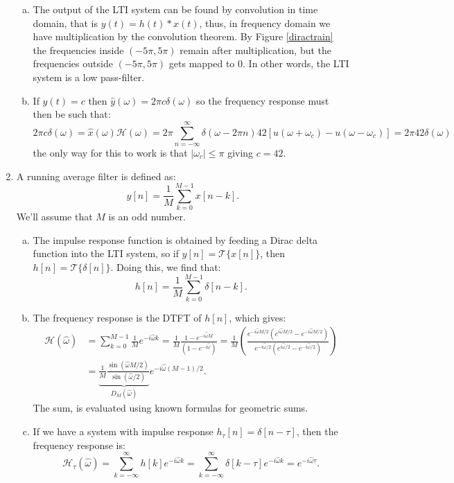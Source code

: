 \begin{enumerate}
\begin{enumerate}[a)]
\item The output of the LTI system can be found by convolution in time domain, that is $y(t)=h(t)*x(t)$, thus, 
in frequency domain we have multiplication by the convolution theorem. By Figure \ref{diractrain} the frequencies 
inside $(-5\pi,5\pi)$ remain after multiplication, but the frequencies outside $(-5\pi,5\pi)$ gets mapped to $0$. 
In other words, the LTI system is a low pass-filter. 

\item If $y(t)=c$ then $\hat{y}(\omega)=2\pi c\delta(\omega)$ so the frequency response must then be such that:
$$2\pi c\delta(\omega)=\hat{x}(\omega)\mathcal{H}(\omega)=2\pi\sum_{n=-\infty}^{\infty}\delta(\omega-2\pi n)42[u(\omega+\omega_{c})-u(\omega-\omega_{c})]=2\pi42\delta(\omega)$$
the only way for this to work is that $|\omega_{c}|\le\pi$ giving $c=42$. 
\end{enumerate}



\item A running average filter is defined as:
$$y[n]=\frac{1}{M}\sum_{k=0}^{M-1}x[n-k].$$
We'll assume that $M$ is an odd number. 

\begin{enumerate}[a)]
\item The impulse response function is obtained by feeding a Dirac delta function into the LTI system, so if $y[n]=\mathcal{T}\{x[n]\}$, then $h[n]=\mathcal{T}\{\delta[n]\}$. Doing this, we find that:
$$h[n]=\frac{1}{M}\sum_{k=0}^{M-1}\delta[n-k].$$

\item The frequency response is the DTFT of $h[n]$, which gives:
\begin{align*}
    \mathcal{H}(\hat{\omega})&=\sum_{k=0}^{M-1}\frac{1}{M}e^{-i\hat{\omega}k}=\frac{1}{M}\frac{1-e^{-i\hat{\omega}M}}{(1-e^{-i\hat{\omega}})}=\frac{1}{M}\left(\frac{e^{-i\hat{\omega}M/2}(e^{i\hat{\omega}M/2}-e^{-i\hat{\omega}M/2})}{e^{-i\hat{\omega}/2}(e^{i\hat{\omega}/2}-e^{-i\hat{\omega}/2})}\right) \\
    &=\underbrace{\frac{1}{M}\frac{\sin(\hat{\omega}M/2)}{\sin(\hat{\omega}/2)}}_{D_{M}(\hat{\omega})}e^{-i\hat{\omega}(M-1)/2}.
\end{align*}
The sum, is evaluated using known formulas for geometric sums. 

\item If we have a system with impulse response $h_{\tau}[n]=\delta[n-\tau]$, then the frequency response is:
$$\mathcal{H}_{\tau}(\hat{\omega})=\sum_{k=-\infty}^{\infty}h[k]e^{-i\hat{\omega}k}=\sum_{k=-\infty}^{\infty}\delta[k-\tau]e^{-i\hat{\omega}k}=e^{-i\hat{\omega}\tau}.$$


\end{enumerate}
\end{enumerate}

